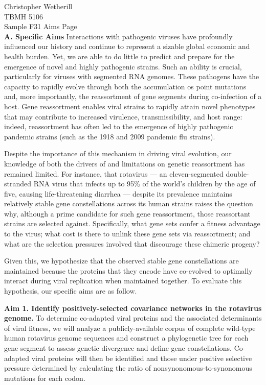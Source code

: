 \documentclass[11pt,letterpaper,final] {article}
\begin{document}

\noindent Christopher Wetherill \\
TBMH 5106 \\
Sample F31 Aims Page \\

\textbf{A. Specific Aims} Interactions with pathogenic viruses have profoundly influenced our history and continue to represent a sizable global economic and health burden. Yet, we are able to do little to predict and prepare for the emergence of novel and highly pathogenic strains. Such an ability is crucial, particularly for viruses with segmented RNA genomes. These pathogens have the capacity to rapidly evolve through both the accumulation os point mutations and, more importantly, the reassortment of gene segments during co-infection of a host. Gene reassortment enables viral strains to rapidly attain novel phenotypes that may contribute to increased virulence, transmissibility, and host range: indeed, reassortment has often led to the emergence of highly pathogenic pandemic strains (such as the 1918 and 2009 pandemic flu strains).

Despite the importance of this mechanism in driving viral evolution, our knowledge of both the drivers of and limitations on genetic reassortment has remained limited. For instance, that rotavirus --- an eleven-segmented double-stranded RNA virus that infects up to 95\% of the world's children by the age of five, causing life-threatening diarrhea --- despite its prevalence maintains relatively stable gene constellations across its human strains raises the question why, although a prime candidate for such gene reassortment, those reassortant strains are selected against. Specifically, what gene sets confer a fitness advantage to the virus; what cost is there to unlink these gene sets via reassortment; and what are the selection pressures involved that discourage these chimeric progeny?

Given this, we hypothesize that the observed stable gene constellations are maintained because the proteins that they encode have co-evolved to optimally interact during viral replication when maintained together. To evaluate this hypothesis, our specific aims are as follow.

\textbf{Aim 1. Identify positively-selected covariance networks in the rotavirus genome.} To determine co-adapted viral proteins and the associated determinants of viral fitness, we will analyze a publicly-available corpus of complete wild-type human rotavirus genome sequences and construct a phylogenetic tree for each gene segment to assess genetic divergence and define gene constellations. Co-adapted viral proteins will then be identified and those under positive selective pressure determined by calculating the ratio of nonsynonomous-to-synonomous mutations for each codon.
\end{document}
